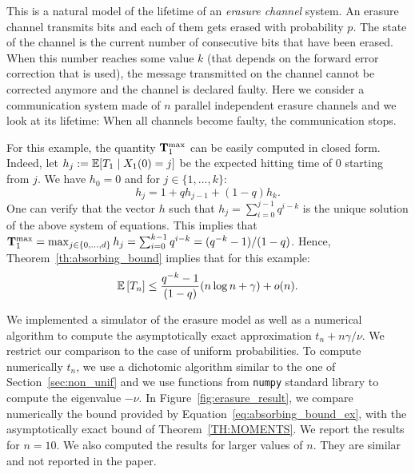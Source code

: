 \documentclass{aptpub}
\newcommand\expect[1]{\mathchoice{\bexpect{#1}}{\sexpect{#1}}{\sexpect{#1}}{\sexpect{#1}}}
\newcommand\bexpect[1]{\mathbb{E}\left[#1\right]}
\newcommand\sexpect[1]{\mathbb{E}[#1]}
\begin{document}
\begin{center}
\end{center}
This is a natural model of the lifetime of an {\it erasure channel }
system.  An erasure channel transmits bits and each of them gets
erased with probability $p$.  The state of the channel is the current
number of consecutive bits that have been erased.  When this number
reaches some value $k$ (that depends on the forward error correction
that is used), the message transmitted on the channel cannot be
corrected anymore and the channel is declared faulty.  Here we
consider a communication system made of $n$ parallel independent
erasure channels and we look at its lifetime: When all channels become
faulty, the communication stops.

For this example, the quantity ${\bf T}^{\max}_1$ can be easily
computed in closed form.  Indeed, let
$h_j:=\expect{T_1 \mid X_1(0) = j}$ be the expected hitting time of
$0$ starting from $j$. We have $h_0=0$ and for $j\in\{1,\dots,k\}$:
\begin{equation*}
  h_j = 1+q h_{j-1} + (1-q) h_k.
\end{equation*}
One can verify that the vector $h$ such that
$h_j=\sum_{i=0}^{j-1} q^{i-k}$ is the unique solution of the above
system of equations. This implies that
${\bf T}^{\max}_1=\max_{j\in\{0,\dots,d\}}h_j = \sum_{i=0}^{k-1}
q^{i-k}=(q^{-k}-1)/(1-q)$.
Hence, Theorem~\ref{th:absorbing_bound} implies that for this example:
\begin{equation}
  \label{eq:absorbing_bound_ex}
  \expect{T_n} \le \frac{q^{-k}-1}{(1-q)}(n\log n + \gamma) + o(n).
\end{equation}

We implemented a simulator of the erasure model as well as a numerical
algorithm to compute the asymptotically exact approximation
$t_n+n\gamma/\nu$. We restrict our comparison to the case of uniform
probabilities.  To compute numerically $t_n$, we use a dichotomic
algorithm similar to the one of Section~\ref{sec:non_unif} and we use
functions from \texttt{numpy} standard library to compute the
eigenvalue $-\nu$.  In Figure~\ref{fig:erasure_result}, we compare
numerically the bound provided by
Equation~\eqref{eq:absorbing_bound_ex}, with the asymptotically exact
bound of Theorem~\ref{TH:MOMENTS}. We report the results for
$n=10$. We also computed the results for larger values of $n$. They
are similar and not reported in the paper.
\end{document}
